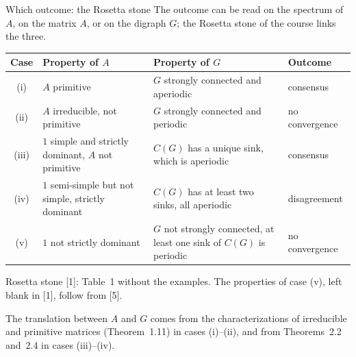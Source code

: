 \begin{frame}[label=m-fdg-rosetta]{Which outcome: the Rosetta stone}
  \centering
  \footnotesize
  The outcome can be read on the spectrum of $A$, on the matrix $A$, or on the digraph
  $G$; the Rosetta stone of the course links the three.

  \vspace{2mm}
  \renewcommand{\arraystretch}{1.25}
  \begin{tabular}{@{}c >{\raggedright\arraybackslash}p{4.4cm}
                    >{\raggedright\arraybackslash}p{5.2cm} l@{}}
    \toprule
    Case & Property of $A$ & Property of $G$ & Outcome \\
    \midrule
    (i)   & $A$ primitive
          & $G$ strongly connected and aperiodic
          & consensus \\
    (ii)  & $A$ irreducible, not primitive
          & $G$ strongly connected and periodic
          & no convergence \\
    (iii) & $1$ simple and strictly dominant, $A$ not primitive
          & $C(G)$ has a unique sink, which is aperiodic
          & consensus \\
    (iv)  & $1$ semi-simple but not simple, strictly dominant
          & $C(G)$ has at least two sinks, all aperiodic
          & disagreement \\
    (v)   & $1$ not strictly dominant
          & $G$ not strongly connected, at least one sink of $C(G)$ is periodic
          & no convergence \\
    \bottomrule
  \end{tabular}

  \vspace{1mm}
  {\scriptsize Rosetta stone [1]: Table~1 without the examples. The properties of case
  (v), left blank in [1], follow from [5].}

  \vspace{1.5mm}
  \raggedright
  The translation between $A$ and $G$ comes from the characterizations of irreducible and
  primitive matrices (Theorem~1.11) in cases (i)--(ii), and from Theorems~2.2 and~2.4 in
  cases (iii)--(iv).


\end{frame}
